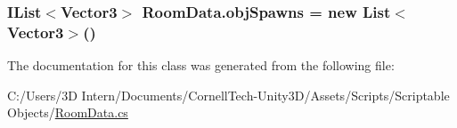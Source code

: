 \subsubsection[{\texorpdfstring{obj\+Spawns}{objSpawns}}]{\setlength{\rightskip}{0pt plus 5cm}I\+List$<$Vector3$>$ Room\+Data.\+obj\+Spawns = new List$<$Vector3$>$()}\hypertarget{class_room_data_acd3e5c77c529bdc6b5e781819190c6dd}{}\label{class_room_data_acd3e5c77c529bdc6b5e781819190c6dd}


The documentation for this class was generated from the following file\+:\begin{DoxyCompactItemize}
\item 
C\+:/\+Users/3\+D Intern/\+Documents/\+Cornell\+Tech-\/\+Unity3\+D/\+Assets/\+Scripts/\+Scriptable Objects/\hyperlink{_room_data_8cs}{Room\+Data.\+cs}\end{DoxyCompactItemize}
